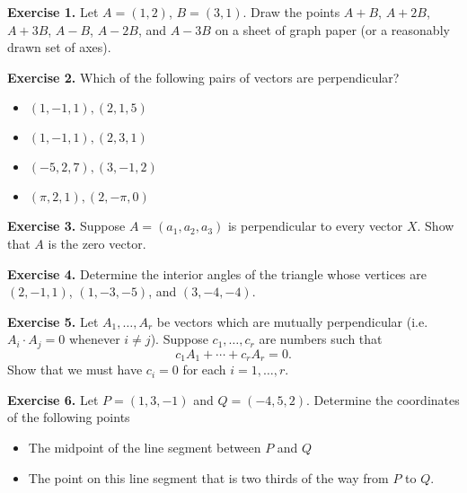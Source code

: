 \documentclass{article}
\begin{document}

\textbf{Exercise 1.}
 Let $A = (1,2)$, $B = (3,1)$. Draw the points $A+B$, $A+2B$, $A+3B$, $A-B$, $A-2B$, and $A - 3B$
 on a sheet of graph paper (or a reasonably drawn set of axes).

\textbf{Exercise 2.} Which of the following pairs of vectors are perpendicular?
\begin{itemize}
    \item $(1,-1,1), (2,1,5)$ 
    \item $(1,-1,1), (2,3,1)$ 
    \item $(-5,2,7), (3,-1,2)$
    \item $(\pi,2,1), (2,-\pi,0)$
\end{itemize}

\textbf{Exercise 3.}
Suppose $A = (a_1,a_2,a_3)$ is perpendicular to every vector $X$. Show that
$A$ is the zero vector.

\textbf{Exercise 4.}  Determine the interior angles of the triangle whose vertices are 
$(2, -1, 1)$, $(1, - 3, - 5)$, and $(3, -4, -4)$.

\textbf{Exercise 5.} Let $A_1, \ldots, A_r$ be vectors which are mutually perpendicular
(i.e. $A_i \cdot A_j = 0$ whenever $i \neq j$). Suppose $c_1, \ldots, c_r$ are numbers such that
\[c_1 A_1 + \cdots + c_r A_r = 0.\]
Show that we must have $c_i = 0$ for each $i=1,\ldots, r$.

\textbf{Exercise 6.} Let $P = (1,3, -1)$ and $Q = (-4,5,2)$. 
Determine the coordinates of the following points
\begin{itemize}
    \item The midpoint of the line segment between $P$ and $Q$
    \item The point on this line segment that is two thirds of the way from $P$ to $Q$.
\end{itemize}


\end{document}
